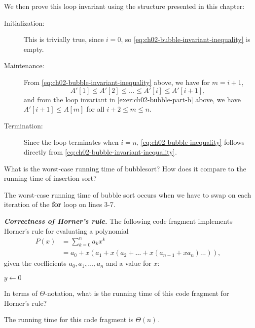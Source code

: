 \documentclass[Chapter02]{subfiles}
\begin{document}
\begin{problems}
\begin{problems}[resume]
\begin{answer}
				We then prove this loop invariant using the structure presented in this chapter:
				\begin{description}
					\item[Initialization:] This is trivially true, since $i = 0$, so \cref{eq:ch02-bubble-invariant-inequality} is empty.

					\item[Maintenance:] From \cref{eq:ch02-bubble-invariant-inequality} above, we have for $m = i + 1$,
					\[
						A'[1] \leq A'[2] \leq \dots \leq A'[i] \leq A'[i + 1],
					\]
					and from the loop invariant in \cref{exer:ch02-bubble-part-b} above, we have $A'[i + 1] \leq A[m]$ for all $i + 2 \leq m \leq n$.

					\item[Termination:] Since the loop terminates when $i = n$, \cref{eq:ch02-bubble-inequality} follows directly from \cref{eq:ch02-bubble-invariant-inequality}.
				\end{description}
			\end{answer}
			
			\item What is the worst-case running time of bubblesort? How does it compare to the running time of insertion sort?
			\begin{answer}
				The worst-case running time of bubble sort occurs when we have to swap on each iteration of the \textbf{for} loop on lines 3-7.
			\end{answer}
			
		\end{problems}
		
		\item \textbf{\textit{Correctness of Horner's rule.}} The following code fragment implements Horner's rule for evaluating a polynomial
		\begin{align*}
			P(x) &= \sum_{k = 0}^n a_kx^k\\
				&= a_0 + x(a_1 + x(a_2 + \dots + x(a_{n - 1} + xa_n) \dots)),
		\end{align*}
		given the coefficients $a_0, a_1, \dots, a_n$ and a value for $x$:

		\begin{algorithm}[H]
			$y \leftarrow 0$\;
		\end{algorithm}
		\begin{problems}
			\item In terms of $\Theta$-notation, what is the running time of this code fragment for Horner's rule?
			\begin{answer}
				The running time for this code fragment is $\Theta(n)$.
			\end{answer}


\end{problems}
\end{problems}
\end{document}
